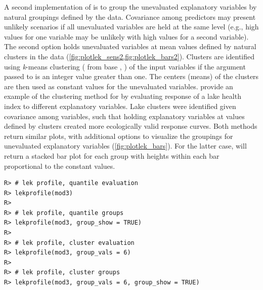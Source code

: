 \documentclass[article,shortnames]{jss}\usepackage[]{graphicx}\usepackage[]{color}
\makeatletter
\newenvironment{kframe}{%
 \def\at@end@of@kframe{}%
 \ifinner\ifhmode%
  \def\at@end@of@kframe{\end{minipage}}%
  \begin{minipage}{\columnwidth}%
 \fi\fi%
 \def\FrameCommand##1{\hskip\@totalleftmargin \hskip-\fboxsep
 \colorbox{shadecolor}{##1}\hskip-\fboxsep
     \hskip-\linewidth \hskip-\@totalleftmargin \hskip\columnwidth}%
 \MakeFramed {\advance\hsize-\width
   \@totalleftmargin\z@ \linewidth\hsize
   \@setminipage}}%
 {\par\unskip\endMakeFramed%
 \at@end@of@kframe}
\newenvironment{knitrout}{}{} %
\makeatother
\begin{document}
A second implementation of  is to group the unevaluated explanatory variables by natural groupings defined by the data. Covariance among predictors may present unlikely scenarios if all unevaluated variables are held at the same level (e.g., high values for one variable may be unlikely with high values for a second variable). The second option holds unevaluated variables at mean values defined by natural clusters in the data (\cref{fig:plotlek_sens2,fig:plotlek_bars2}). Clusters are identified using {\it k}-means clustering ( from base , \citealt{Hartigan79}) of the input variables if the argument passed to  is an integer value greater than one. The centers (means) of the clusters are then used as constant values for the unevaluated variables.  \citet{Beck14a} provide an example of the clustering method for  by evaluating response of a lake health index to different explanatory variables.  Lake clusters were identified given covariance among variables, such that holding explanatory variables at values defined by clusters created more ecologically valid response curves.  Both methods return similar plots, with additional options to visualize the groupings for unevaluated explanatory variables (\cref{fig:plotlek_bars}).  For the latter case,  will return a stacked bar plot for each group with heights within each bar proportional to the constant values.
\begin{knitrout}
\color{fgcolor}\begin{kframe}
\begin{verbatim}
R> # lek profile, quantile evaluation
R> lekprofile(mod3)
R> 
R> # lek profile, quantile groups 
R> lekprofile(mod3, group_show = TRUE)
R> 
R> # lek profile, cluster evaluation
R> lekprofile(mod3, group_vals = 6)
R> 
R> # lek profile, cluster groups
R> lekprofile(mod3, group_vals = 6, group_show = TRUE)
\end{verbatim}
\end{kframe}
\end{knitrout}
\end{document}

